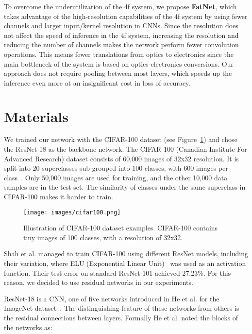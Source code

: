 \documentclass{article}
\begin{document}
To overcome the underutilization of the 4f system, we propose {\bf FatNet}, which takes advantage of the high-resolution capabilities of the 4f system by using fewer channels and larger input/kernel resolution in CNNs. Since the resolution does not affect the speed of inference in the 4f system, increasing the resolution and reducing the number of channels makes the network perform fewer convolution operations. This means fewer translations from optics to electronics since the main bottleneck of the system is based on optics-electronics conversions. Our approach does not require pooling between most layers, which speeds up the inference even more at an insignificant cost in loss of accuracy.



\section{Materials}
We trained our network with the CIFAR-100 dataset (see Figure~\ref{fig:cifar100}) and chose the ResNet-18 as the backbone network.
The CIFAR-100 (Canadian Institute For Advanced Research) dataset consists of 60,000 images of 32x32 resolution. It is split into 20 superclasses sub-grouped into 100 classes, with 600 images per class~\cite{krizhevsky_learning_2009}. Only 50,000 images are used for training, and the other 10,000 data samples are in the test set. The similarity of classes under the same superclass in CIFAR-100 makes it harder to train. 

\begin{figure}[h]
    \centering
    \texttt{[image: images/cifar100.png]}
    \caption{Illustration of CIFAR-100 dataset examples. CIFAR-100 contains tiny images of 100 classes, with a resolution of 32x32.}
    \label{fig:cifar100}
\end{figure}

Shah et al. \cite{shah_deep_2016} managed to train CIFAR-100 using different ResNet models, including their variation, where ELU (Exponential Linear Unit)~\cite{clevert_fast_2016} was used as an activation function. Their test error on standard ResNet-101 achieved 27.23\%. For this reason, we decided to use residual networks in our experiments.

ResNet-18 is a CNN, one of five networks introduced in He et al. \cite{he_deep_2016} for the ImageNet dataset~\cite{deng_imagenet_2009}. The distinguishing feature of these networks from others is the residual connections between layers. Formally He et al.\cite{he_deep_2016} noted the blocks of the networks as:
\end{document}
